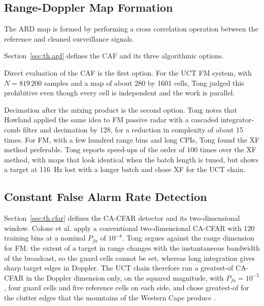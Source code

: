 \subsection{Range-Doppler Map Formation}
\label{subsec:ch2.chain.ard}
The ARD map is formed by performing a cross correlation operation between the reference and cleaned surveillance signals. 

Section~\ref{sec:th.ard} defines the CAF and its three algorithmic options.

Direct evaluation of the CAF is the first option. For the UCT FM system, with $N = 819\,200$ samples and a map of about 280 by 1601 cells, Tong \citep{tong2014} judged this prohibitive even though every cell is independent and the work is parallel. 

Decimation after the mixing product is the second option. Tong \citep{tong2014} notes that Howland applied the same idea to FM passive radar with a cascaded integrator-comb filter and decimation by 128, for a reduction in complexity of about 15 times. For FM, with a few hundred range bins and long CPIs, Tong \citep{tong2014} found the XF method preferable. Tong \citep{tong2014} reports speed-ups of the order of 100 times over the XF method, with maps that look identical when the batch length is tuned, but shows a target at 116~Hz lost with a longer batch and chose XF for the UCT chain.


\subsection{Constant False Alarm Rate Detection}
\label{subsec:ch2.chain.cfar}

Section~\ref{sec:th.cfar} defines the CA-CFAR detector and its two-dimensional window. Colone et al. \citep{colone2009} apply a conventional two-dimensional CA-CFAR with 120 training bins at a nominal $P_{fa}$ of $10^{-4}$. Tong \citep{tong2014} argues against the range dimension for FM: the extent of a target in range changes with the instantaneous bandwidth of the broadcast, so the guard cells cannot be set, whereas long integration gives sharp target edges in Doppler. The UCT chain therefore ran a greatest-of CA-CFAR in the Doppler dimension only, on the squared magnitude, with $P_{fa} = 10^{-5}$, four guard cells and five reference cells on each side, and chose greatest-of for the clutter edges that the mountains of the Western Cape produce \citep{tong2014}. 

